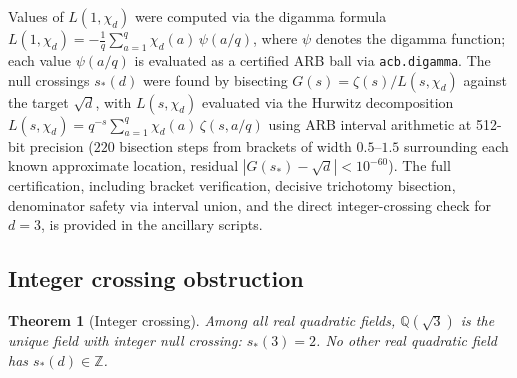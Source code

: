 \documentclass[12pt,reqno]{amsart}
\theoremstyle{plain}
\newtheorem{theorem}{Theorem}[section]
\theoremstyle{definition}
\theoremstyle{remark}
\newcommand{\Q}{\mathbb{Q}}
\newcommand{\Z}{\mathbb{Z}}
\begin{document}
Values of $L(1,\chi_d)$ were computed via the digamma formula
$L(1,\chi_d) = -\tfrac{1}{q}\sum_{a=1}^{q}\chi_d(a)\,\psi(a/q)$,
where $\psi$ denotes the digamma function; each value $\psi(a/q)$ is evaluated as a certified ARB ball via \texttt{acb.digamma}.
The null crossings $s_*(d)$ were found by bisecting $G(s) = \zeta(s)/L(s,\chi_d)$
against the target $\sqrt{d}$, with $L(s,\chi_d)$ evaluated via the Hurwitz decomposition
$L(s,\chi_d) = q^{-s}\sum_{a=1}^{q}\chi_d(a)\,\zeta(s,a/q)$
using ARB interval arithmetic at 512-bit precision ($220$ bisection steps from brackets of width $0.5$--$1.5$ surrounding each known approximate location, residual $|G(s_*) - \sqrt{d}| < 10^{-60}$).  The full certification, including bracket verification, decisive trichotomy bisection, denominator safety via interval union, and the direct integer-crossing check for $d = 3$, is provided in the ancillary scripts.

\subsection{Integer crossing obstruction}

\begin{theorem}[Integer crossing]\label{thm:integer-crossing}
Among all real quadratic fields, $\Q(\sqrt{3})$ is the unique field with integer null crossing: $s_*(3) = 2$. No other real quadratic field has $s_*(d) \in \Z$.
\end{theorem}
\end{document}
